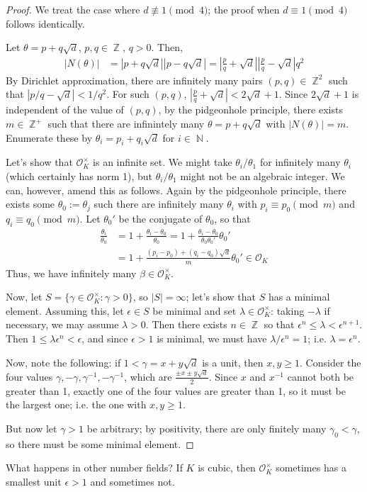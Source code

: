 \documentclass[11pt, a4paper]{memoir}
\DeclareMathOperator{\N}{{\mathbb{N}}}
\DeclareMathOperator{\Z}{{\mathbb{Z}}}
\theoremstyle{change}
\theoremstyle{plain}
\theoremstyle{nonumberplain}
\newtheorem{proof}{Proof}
\begin{document}
\begin{proof}
    We treat the case where $d\nequiv 1\pmod{4}$; the proof when $d\equiv 1\pmod{4}$ follows identically.

    Let $\theta=p+q\sqrt{d}$, $p,q\in\Z$, $q>0$.
    Then,
    \begin{align*}
        |N(\theta)| &= |p+q\sqrt{d}||p-q\sqrt{d}| = \left\lvert\frac{p}{q}+\sqrt{d}\right\rvert\left\lvert\frac{p}{q}-\sqrt{d}\right\rvert q^2
    \end{align*}
    By Dirichlet approximation, there are infinitely many pairs $(p,q)\in\Z^2$ such that $|p/q-\sqrt{d}|<1/q^2$.
    For such $(p,q)$, $\left\lvert\frac{p}{q}+\sqrt{d}\right\rvert<2\sqrt{d}+1$.
    Since $2\sqrt{d}+1$ is independent of the value of $(p,q)$, by the pidgeonhole principle, there exists $m\in\Z^+$ such that there are infinintely many $\theta=p+q\sqrt{d}$ with $|N(\theta)|=m$.
    Enumerate these by $\theta_i=p_i+q_i\sqrt{d}$ for $i\in\N$.

    Let's show that $\mathcal{O}_K^\times$ is an infinite set.
    We might take $\theta_i/\theta_1$ for infinitely many $\theta_i$ (which certainly has norm 1), but $\theta_i/\theta_1$ might not be an algebraic integer.
    We can, however, amend this as follows.
    Again by the pidgeonhole principle, there exists some $\theta_0:=\theta_j$ such there are infinitely many $\theta_i$ with $p_i\equiv p_0\pmod{m}$ and $q_i\equiv q_0\pmod{m}$.
    Let $\theta_0'$ be the conjugate of $\theta_0$, so that
    \begin{align*}
        \frac{\theta_i}{\theta_0} &= 1+\frac{\theta_i-\theta_0}{\theta_0}= 1+\frac{\theta_i-\theta_0}{\theta_0\theta_0'}\theta_0'\\
                                  &= 1+\frac{(p_i-p_0)+(q_i-q_0)\sqrt{d}}{m}\theta_0'\in\mathcal{O}_K
    \end{align*}
    Thus, we have infinitely many $\beta\in\mathcal{O}_K^\times$.

    Now, let $S=\{\gamma\in\mathcal{O}_K^\times:\gamma>0\}$, so $|S|=\infty$; let's show that $S$ has a minimal element.
    Assuming this, let $\epsilon\in S$ be minimal and set $\lambda\in\mathcal{O}_K^\times$: taking $-\lambda$ if necessary, we may assume $\lambda>0$.
    Then there exists $n\in\Z$ so that $\epsilon^n\leq\lambda<\epsilon^{n+1}$.
    Then $1\leq\lambda\epsilon^n<\epsilon$, and since $\epsilon>1$ is minimal, we must have $\lambda/\epsilon^n=1$; i.e. $\lambda=\epsilon^n$.

    Now, note the following: if $1<\gamma=x+y\sqrt{d}$ is a unit, then $x,y\geq 1$.
    Consider the four values $\gamma,-\gamma,\gamma^{-1},-\gamma^{-1}$, which are $\frac{\pm x\pm y\sqrt{d}}{2}$.
    Since $x$ and $x^{-1}$ cannot both be greater than 1, exactly one of the four values are greater than 1, so it must be the largest one; i.e. the one with $x,y\geq 1$.

    But now let $\gamma>1$ be arbitrary; by positivity, there are only finitely many $\gamma_0<\gamma$, so there must be some minimal element.
\end{proof}
What happens in other number fields?
If $K$ is cubic, then $\mathcal{O}_K^\times$ sometimes has a smallest unit $\epsilon>1$ and sometimes not.
\end{document}
